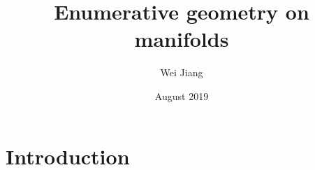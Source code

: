 \documentclass{article}
\title{Enumerative geometry on manifolds}
\author{Wei Jiang}
\date{August 2019}
\begin{document}
\theoremstyle{definition}
\newtheorem{df}{Def}[section]
\newtheorem{eg}[df]{Eg}

\theoremstyle{plain}
\newtheorem{thm}[df]{Thm}
\newtheorem{lm}[df]{Lem}

\tableofcontents
\newpage

\section{Introduction}

\end{document}
